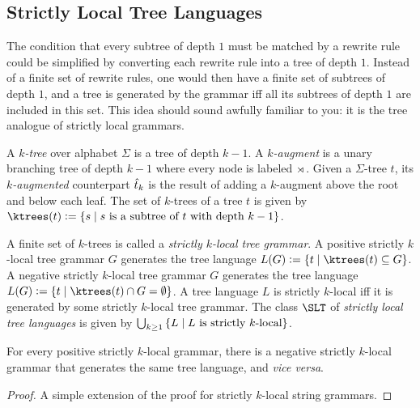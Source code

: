 \subsection{Strictly Local Tree Languages}

The condition that every subtree of depth $1$ must be matched by a rewrite rule could be simplified by converting each rewrite rule into a tree of depth $1$.
Instead of a finite set of rewrite rules, one would then have a finite set of subtrees of depth $1$, and a tree is generated by the grammar iff all its subtrees of depth $1$ are included in this set.
This idea should sound awfully familiar to you: it is the tree analogue of strictly local grammars.
%
\begin{definition}[$k$-trees]
    A \emph{$k$-tree} over alphabet $\Sigma$ is a tree of depth $k-1$.
    A \emph{$k$-augment} is a unary branching tree of depth $k-1$ where every node is labeled $\rtimes$.
    Given a $\Sigma$-tree $t$, its \emph{$k$-augmented} counterpart $\hat{t}_k$ is the result of adding a $k$-augment above the root and below each leaf.
    The set of $k$-trees of a tree $t$ is given by $\ktrees(t) \is \setof{ s \mid s \text{ is a subtree of } t \text{ with depth } k-1}$.
\end{definition}
%
\begin{definition}
    A finite set of $k$-trees is called a \emph{strictly $k$-local tree grammar}.
    A positive strictly $k$-local tree grammar $G$ generates the tree language $L(G) \is \setof{ t \mid \ktrees(t) \subseteq G}$.
    A negative strictly $k$-local tree grammar $G$ generates the tree language $L(G) \is \setof{ t \mid \ktrees(t) \cap G = \emptyset}$.
    A tree language $L$ is strictly $k$-local iff it is generated by some strictly $k$-local tree grammar.
    The class $\SLT$ of \emph{strictly local tree languages} is given by $\bigcup_{k \geq 1} \left \{  L \mid L \text{ is strictly $k$-local} \right \}$.
\end{definition}

\begin{lemma}
    For every positive strictly $k$-local grammar, there is a negative strictly $k$-local grammar that generates the same tree language, and \emph{vice versa}.    
\end{lemma}
%
\begin{proof}
    A simple extension of the proof for strictly $k$-local string grammars.
\end{proof}

